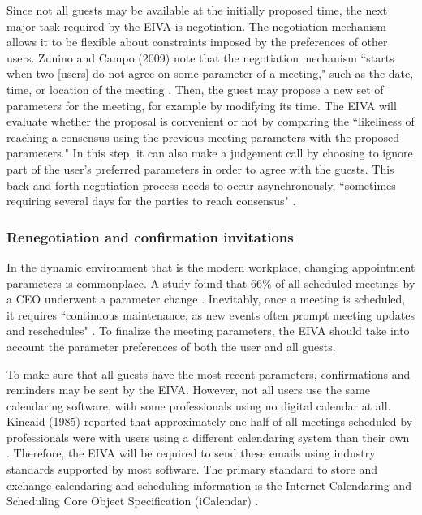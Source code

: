 \documentclass{article}
\begin{document}
Since not all guests may be available at the initially proposed time, the next major task required by the EIVA is negotiation. The negotiation mechanism allows it to be flexible about constraints imposed by the preferences of other users. Zunino and Campo (2009) note that the negotiation mechanism ``starts when two [users] do not agree on some parameter of a meeting," such as the date, time, or location of the meeting \cite{zunino_chronos_2009}. Then, the guest may propose a new set of parameters for the meeting, for example by modifying its time. The EIVA will evaluate whether the proposal is convenient or not by comparing the ``likeliness of reaching a consensus using the previous meeting parameters with the proposed parameters." In this step, it can also make a judgement call by choosing to ignore part of the user's preferred parameters in order to agree with the guests. This back-and-forth negotiation process needs to occur asynchronously, ``sometimes requiring several days for the parties to reach consensus" \cite{cranshaw_calendarhelp_2017}.

\subsubsection{Renegotiation and confirmation invitations}

In the dynamic environment that is the modern workplace, changing appointment parameters is commonplace. A study found that 66\% of all scheduled meetings by a CEO underwent a parameter change \cite{dennis_how_2018}. Inevitably, once a meeting is scheduled, it requires ``continuous maintenance, as new events often prompt meeting updates and reschedules" \cite{cranshaw_calendarhelp_2017}. To finalize the meeting parameters, the EIVA should take into account the parameter preferences of both the user and all guests.

To make sure that all guests have the most recent parameters, confirmations and reminders may be sent by the EIVA. However, not all users use the same calendaring software, with some professionals using no digital calendar at all. Kincaid (1985) reported that approximately one half of all meetings scheduled by professionals were with users using a different calendaring system than their own \cite{kincaid_electronic_1985}. Therefore, the EIVA will be required to send these emails using industry standards supported by most software. The primary standard to store and exchange calendaring and scheduling information is the Internet Calendaring and Scheduling Core Object Specification (iCalendar) \cite{desruisseaux_internet_2009}.
\end{document}
